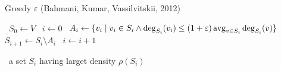 \begin{algorithm}
    \caption{Greedy $\varepsilon$ (Bahmani, Kumar, Vassilvitskii, 2012)}\label{alg:greedy_epsilon}
    \begin{algorithmic}%
            \State~$S_0 \gets V$
            \State~$i \gets 0$
                    \State~$A_i \gets \{ v_i \; \vert \; v_i \in S_i \wedge \deg_{S_i}(v_i) \leq (1+\varepsilon) \operatorname*{avg}_{v \in S_i} \deg_{S_i}(v) \}$
                    \State~$S_{i+1} \gets S_i \setminus A_i$
                    \State~$i \gets i+1$
                \EndWhile
                
            \Return~a set $S_i$ having larget density $\rho(S_i)$
        \EndProcedure
    \end{algorithmic}
\end{algorithm}